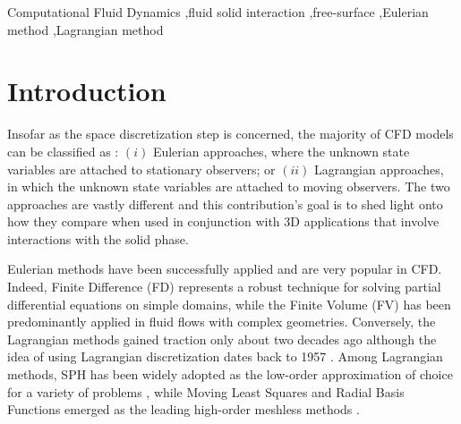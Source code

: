 \documentclass[final,3p,times]{elsarticle}
\begin{document}
\begin{frontmatter}
\begin{keyword}

Computational Fluid Dynamics \sep fluid solid interaction  \sep free-surface \sep Eulerian method \sep Lagrangian method
\end{keyword}

\end{frontmatter}

\section{Introduction}
\label{sec:Introduction}


Insofar as the space discretization step is concerned, the majority of CFD models can be classified as : $(i)$ Eulerian approaches, where the unknown state variables are attached to stationary observers; or $(ii)$ Lagrangian approaches, in which the unknown state variables are attached to moving observers. The two approaches are vastly different and this contribution's goal is to shed light onto how they compare when used in conjunction with 3D applications that involve interactions with the solid phase.

Eulerian methods have been successfully applied and are very popular in CFD. Indeed, Finite Difference (FD) represents a robust technique for solving partial differential equations on simple domains, while the Finite Volume (FV) has been predominantly applied in fluid flows with complex geometries. Conversely, the Lagrangian methods gained traction only about two decades ago although the idea of using Lagrangian discretization dates back to 1957 \cite{PIC}. Among Lagrangian methods, SPH  \cite{Lucy1977,Gingold1977} has been widely adopted as the low-order approximation of choice for a variety of problems \cite{Monaghan2005a}, while Moving Least Squares and Radial Basis Functions emerged as the leading high-order meshless methods \cite{trask2016compact,hu2019spatially,trask2018compatible,kansa1990scattered}. 
\end{document}
